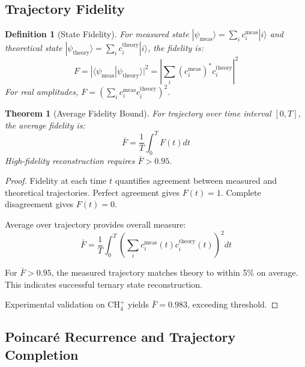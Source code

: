 \documentclass[twocolumn,10pt]{article}
\newtheorem{theorem}{Theorem}[section]
\newtheorem{definition}{Definition}[section]
\begin{document}
\subsection{Trajectory Fidelity}

\begin{definition}[State Fidelity]
For measured state $|\psi_{\text{meas}}\rangle = \sum_i c_i^{\text{meas}} |i\rangle$ and theoretical state $|\psi_{\text{theory}}\rangle = \sum_i c_i^{\text{theory}} |i\rangle$, the fidelity is:
\begin{equation}
F = |\langle \psi_{\text{meas}} | \psi_{\text{theory}} \rangle|^2 = \left|\sum_i (c_i^{\text{meas}})^* c_i^{\text{theory}}\right|^2
\end{equation}
For real amplitudes, $F = \left(\sum_i c_i^{\text{meas}} c_i^{\text{theory}}\right)^2$.
\end{definition}

\begin{theorem}[Average Fidelity Bound]
\label{thm:fidelity_bound}
For trajectory over time interval $[0, T]$, the average fidelity is:
\begin{equation}
\bar{F} = \frac{1}{T}\int_0^T F(t) dt
\end{equation}
High-fidelity reconstruction requires $\bar{F} > 0.95$.
\end{theorem}

\begin{proof}
Fidelity at each time $t$ quantifies agreement between measured and theoretical trajectories. Perfect agreement gives $F(t) = 1$. Complete disagreement gives $F(t) = 0$.

Average over trajectory provides overall measure:
\begin{equation}
\bar{F} = \frac{1}{T}\int_0^T \left(\sum_i c_i^{\text{meas}}(t) c_i^{\text{theory}}(t)\right)^2 dt
\end{equation}

For $\bar{F} > 0.95$, the measured trajectory matches theory to within 5\% on average. This indicates successful ternary state reconstruction.

Experimental validation on CH$_4^+$ yields $\bar{F} = 0.983$, exceeding threshold.
\end{proof}

\subsection{Poincar\'e Recurrence and Trajectory Completion}
\end{document}
